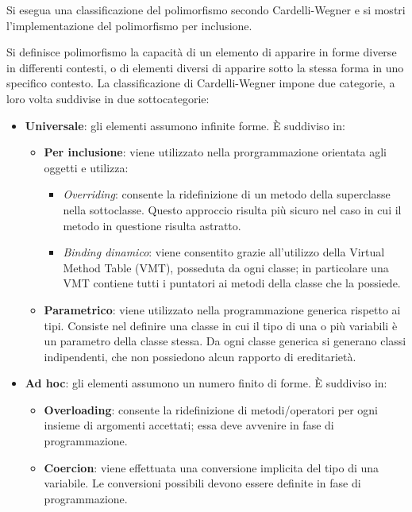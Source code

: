 \begin{problem}{1.2}
Si esegua una classificazione del polimorfismo secondo Cardelli-Wegner e si mostri l'implementazione del polimorfismo per inclusione.
\end{problem}
\begin{solution}
Si definisce polimorfismo la capacità di un elemento di apparire in forme diverse in differenti contesti, o di elementi diversi di apparire sotto la stessa forma in uno specifico contesto.
La classificazione di Cardelli-Wegner impone due categorie, a loro volta suddivise in due sottocategorie:
\begin{itemize}
	\item \textbf{Universale}: gli elementi assumono infinite forme.
	\newline
	È suddiviso in:
	\begin{itemize}
		\item \textbf{Per inclusione}: viene utilizzato nella prorgrammazione orientata agli oggetti e utilizza:
		\begin{itemize}
			\item \textit{Overriding}: consente la ridefinizione di un metodo della superclasse nella sottoclasse. Questo approccio risulta più sicuro nel caso in cui il metodo in questione risulta astratto.
			\item \textit{Binding dinamico}: viene consentito grazie all'utilizzo della Virtual Method Table (VMT), posseduta da ogni classe; in particolare una VMT contiene tutti i puntatori ai metodi della classe che la possiede.
		\end{itemize}
		\item \textbf{Parametrico}: viene utilizzato nella programmazione generica rispetto ai tipi.
		Consiste nel definire una classe in cui il tipo di una o più variabili è un parametro della classe stessa.
		Da ogni classe generica si generano classi indipendenti, che non possiedono alcun rapporto di ereditarietà.
	\end{itemize}

	\item \textbf{Ad hoc}: gli elementi assumono un numero finito di forme.
	È suddiviso in:
	\begin{itemize}
		\item \textbf{Overloading}: consente la ridefinizione di metodi/operatori per ogni insieme di argomenti
		accettati; essa deve avvenire in fase di programmazione.

		\item \textbf{Coercion}: viene effettuata una conversione implicita del tipo di una variabile. Le conversioni possibili devono essere definite in fase
		di programmazione.


\end{itemize}
\end{itemize}
\end{solution}
